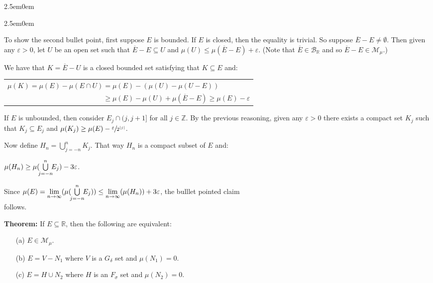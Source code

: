 \documentclass{book}
\newenvironment{myIndent}{%
   \begin{adjustwidth}{2.5em}{0em}%
}{%
   \end{adjustwidth}%
}
\newcommand{\blab}[1]{\textbf{#1}}
\newcommand{\retTwo}{\hfill\bigbreak}
\begin{document}
\begin{myIndent}
\begin{itemize}
\begin{myIndent}
         To show the second bullet point, first suppose $E$ is bounded. If $E$ is closed, then the equality is trivial. So suppose $\overline{E} - E \neq \emptyset$. Then given any $\varepsilon > 0$, let $U$ be an open set such that $\overline{E} - E \subseteq U$ and $\mu(U) \leq \mu(\overline{E} - E) + \varepsilon$. (Note that $\overline{E} \in \mathcal{B}_\mathbb{R}$ and so $\overline{E} - E \in \mathcal{M}_\mu$.)\retTwo

         We have that $K = \overline{E} - U$ is a closed bounded set satisfying that $K \subseteq E$ and:

         {\centering 
         \begin{tabular}{l}
            $\mu(K) = \mu(E) - \mu(E \cap U) = \mu(E) - (\mu(U) - \mu(U - E))$\\ $\phantom{\mu(K) = \mu(E) - \mu(E \cap U)} \geq \mu(E) - \mu(U) + \mu(\overline{E} - E) \geq \mu(E) - \varepsilon$
         \end{tabular} \retTwo\par}

         If $E$ is unbounded, then consider $E_j \cap (j, j+1]$ for all $j \in \mathbb{Z}$. By the previous reasoning, given any $\varepsilon > 0$ there exists a compact set $K_j$ such that $K_j \subseteq E_j$ and $\mu(K_j) \geq \mu(E) - \sfrac{\varepsilon}{2^{|j|}}$.\newpage

         Now define $H_n = \bigcup\limits_{j=-n}^nK_j$. That way $H_n$ is a compact subset of $E$ and:\\ [-10pt]
         
         {\centering $\mu(H_n) \geq \mu(\hspace{-0.2em}\bigcup\limits_{j=-n}^n\hspace{-0.4em} E_j) - 3\varepsilon$.\\ [2pt]\par}

         Since $\mu(E) = \lim\limits_{n \rightarrow \infty}(\mu(\hspace{-0.2em}\bigcup\limits_{j=-n}^n\hspace{-0.4em} E_j)) \leq \lim\limits_{n \rightarrow \infty}(\mu(H_n)) + 3\varepsilon$, the bulllet pointed claim\\ [-8pt] follows.\retTwo
      \end{myIndent}
   \end{itemize}

   \blab{Theorem:} If $E \subseteq \mathbb{R}$, then the following are equivalent:
   \begin{itemize}
      \item[(a)] $E \in \mathcal{M}_\mu$.
      \item[(b)] $E = V - N_1$ where $V$ is a $G_\delta$ set and $\mu(N_1) = 0$.
      \item[(c)] $E = H \cup N_2$ where $H$ is an $F_\sigma$ set and $\mu(N_2) = 0$.\retTwo
      

\end{itemize}
\end{myIndent}
\end{document}
